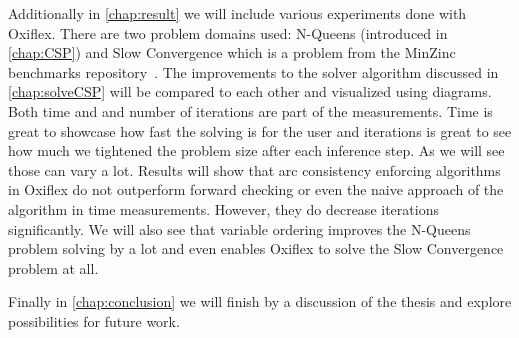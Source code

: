 Additionally in \cref{chap:result} we will include various experiments done with Oxiflex. There are two problem domains used: N-Queens (introduced in \cref{chap:CSP}) and Slow Convergence which is a problem from the MinZinc benchmarks repository~\cite{minizinc_slow:2018}. The improvements to the solver algorithm discussed in \cref{chap:solveCSP} will be compared to each other and visualized using diagrams. Both time and and number of iterations are part of the measurements. Time is great to showcase how fast the solving is for the user and iterations is great to see how much we tightened the problem size after each inference step. As we will see those can vary a lot. Results will show that arc consistency enforcing algorithms in Oxiflex do not outperform forward checking or even the naive approach of the algorithm in time measurements. However, they do decrease iterations significantly. We will also see that variable ordering improves the N-Queens problem solving by a lot and even enables Oxiflex to solve the Slow Convergence problem at all.

Finally in \cref{chap:conclusion} we will finish by a discussion of the thesis and explore possibilities for future work.

